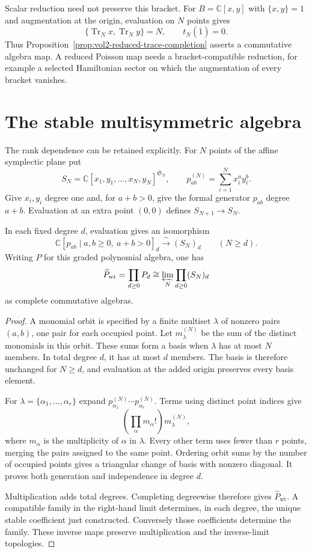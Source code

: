 Scalar reduction need not preserve this bracket.
For $B=\mathbb C[x,y]$ with $\{x,y\}=1$ and augmentation
at the origin, evaluation on $N$ points gives
\[
 \{\operatorname{Tr}_Nx,\operatorname{Tr}_Ny\}=N,
 \qquad t_N(\overline1)=0.
\]
Thus Proposition~\ref{prop:vol2-reduced-trace-completion}
asserts a commutative algebra map.
A reduced Poisson map needs a bracket-compatible reduction,
for example a selected Hamiltonian sector on which the
augmentation of every bracket vanishes.

\section{The stable multisymmetric algebra}
\label{sec:vol2-stable-multisymmetric}

The rank dependence can be retained explicitly.
For $N$ points of the affine symplectic plane put
\[
 S_N=\mathbb C[x_1,y_1,\ldots,x_N,y_N]^{\mathfrak S_N},
 \qquad
 p_{ab}^{(N)}=\sum_{i=1}^Nx_i^ay_i^b.
\]
Give $x_i,y_i$ degree one and, for $a+b>0$, give the
formal generator $p_{ab}$ degree $a+b$.
Evaluation at an extra point $(0,0)$ defines
$S_{N+1}\to S_N$.

\begin{theorem}\label{thm:vol2-stable-multisymmetric-ring}
In each fixed degree $d$, evaluation gives an isomorphism
\[
 \mathbb C[p_{ab}\mid a,b\geq0,\ a+b>0]_d
   \xrightarrow{\ \sim\ }(S_N)_d
 \qquad (N\geq d).
\]
Writing $P$ for this graded polynomial algebra, one has
\[
 \widehat P_{\mathrm{wt}}=\prod_{d\geq0}P_d
 \cong
 \varprojlim_N\prod_{d\geq0}(S_N)_d
\]
as complete commutative algebras.
\end{theorem}
\begin{proof}
A monomial orbit is specified by a finite multiset
$\lambda$ of nonzero pairs $(a,b)$, one pair for each
occupied point. Let $m_\lambda^{(N)}$ be the sum of the
distinct monomials in this orbit.
These sums form a basis when $\lambda$ has at most $N$
members. In total degree $d$, it has at most $d$ members.
The basis is therefore unchanged for $N\geq d$, and
evaluation at the added origin preserves every basis element.

For $\lambda=\{\alpha_1,\ldots,\alpha_r\}$ expand
$p_{\alpha_1}^{(N)}\cdots p_{\alpha_r}^{(N)}$.
Terms using distinct point indices give
\[
 \left(\prod_\alpha m_\alpha!\right)m_\lambda^{(N)},
\]
where $m_\alpha$ is the multiplicity of $\alpha$ in
$\lambda$. Every other term uses fewer than $r$ points,
merging the pairs assigned to the same point.
Ordering orbit sums by the number of occupied points
gives a triangular change of basis with nonzero diagonal.
It proves both generation and independence in degree $d$.

Multiplication adds total degrees. Completing degreewise
therefore gives $\widehat P_{\mathrm{wt}}$.
A compatible family in the right-hand limit determines,
in each degree, the unique stable coefficient just
constructed. Conversely those coefficients determine the
family. These inverse maps preserve multiplication and
the inverse-limit topologies.
\end{proof}

